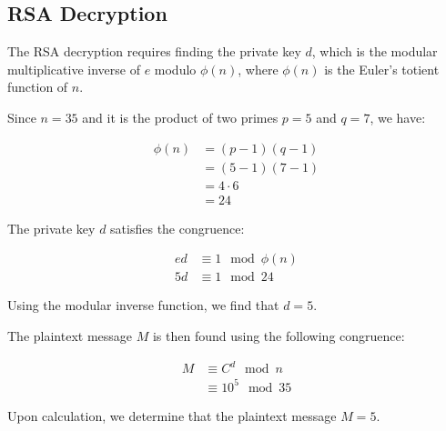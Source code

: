 \documentclass[9pt]{article}
\begin{document}
\begin{CJK*}{UTF8}{gbsn}
\subsection*{RSA Decryption}

The RSA decryption requires finding the private key \( d \), which is the modular multiplicative inverse of \( e \) modulo \( \phi(n) \), where \( \phi(n) \) is the Euler's totient function of \( n \).

Since \( n = 35 \) and it is the product of two primes \( p = 5 \) and \( q = 7 \), we have:

\begin{align*}
\phi(n) &= (p-1)(q-1) \\
&= (5-1)(7-1) \\
&= 4 \cdot 6 \\
&= 24
\end{align*}

The private key \( d \) satisfies the congruence:

\begin{align*}
ed &\equiv 1 \mod \phi(n) \\
5d &\equiv 1 \mod 24
\end{align*}

Using the modular inverse function, we find that \( d = 5 \).

The plaintext message \( M \) is then found using the following congruence:

\begin{align*}
M &\equiv C^d \mod n \\
&\equiv 10^5 \mod 35
\end{align*}

Upon calculation, we determine that the plaintext message \( M = 5 \).

\end{CJK*}
\end{document}
